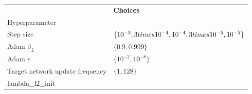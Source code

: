 \begin{tabular}{ll}
 & \bfseries Choices \\
Hyperparameter &  \\
Step size & $\{10^{-3}, 3 \\times 10^{-4}, 10^{-4}, 3 \\times 10^{-5}, 10^{-5}\}$ \\
Adam $\beta_2$ & $\{0.9, 0.999\}$ \\
Adam $\epsilon$ & $\{10^{-2}, 10^{-8}\}$ \\
Target network update frequency & $\{1, 128\}$ \\
lambda_l2_init &  \\
\end{tabular}
